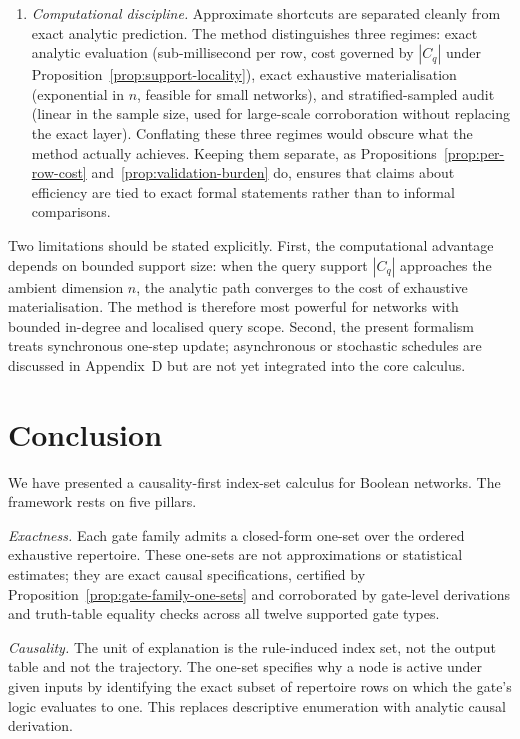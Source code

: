 \documentclass[11pt]{article}
\theoremstyle{definition}
\begin{document}
\begin{enumerate}[label=\arabic*.]
\item \emph{Computational discipline.} Approximate shortcuts are separated cleanly from exact analytic prediction. The method distinguishes three regimes: exact analytic evaluation (sub-millisecond per row, cost governed by \(|C_q|\) under Proposition~\ref{prop:support-locality}), exact exhaustive materialisation (exponential in \(n\), feasible for small networks), and stratified-sampled audit (linear in the sample size, used for large-scale corroboration without replacing the exact layer). Conflating these three regimes would obscure what the method actually achieves. Keeping them separate, as Propositions~\ref{prop:per-row-cost} and~\ref{prop:validation-burden} do, ensures that claims about efficiency are tied to exact formal statements rather than to informal comparisons.
\end{enumerate}

Two limitations should be stated explicitly. First, the computational advantage depends on bounded support size: when the query support \(|C_q|\) approaches the ambient dimension \(n\), the analytic path converges to the cost of exhaustive materialisation. The method is therefore most powerful for networks with bounded in-degree and localised query scope. Second, the present formalism treats synchronous one-step update; asynchronous or stochastic schedules are discussed in Appendix~D but are not yet integrated into the core calculus.

\section{Conclusion}
We have presented a causality-first index-set calculus for Boolean networks. The framework rests on five pillars.

\emph{Exactness.} Each gate family admits a closed-form one-set over the ordered exhaustive repertoire. These one-sets are not approximations or statistical estimates; they are exact causal specifications, certified by Proposition~\ref{prop:gate-family-one-sets} and corroborated by gate-level derivations and truth-table equality checks across all twelve supported gate types.

\emph{Causality.} The unit of explanation is the rule-induced index set, not the output table and not the trajectory. The one-set specifies why a node is active under given inputs by identifying the exact subset of repertoire rows on which the gate's logic evaluates to one. This replaces descriptive enumeration with analytic causal derivation.
\end{document}
